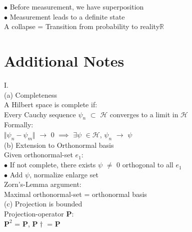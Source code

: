 \documentclass[10pt,fancy]{elegantbook}
\begin{document}
{$\bullet$ Before measurement, we have superposition  \\
  
$\bullet$ Measurement leads to a definite state  \\

A collapse = Transition from probability to reality$\mathbb R$


\section{Additional Notes}

I.  \\  

(a) Completeness  \\

A Hilbert space is complete if:  \\

    Every Cauchy sequence $\psi_n$ $\subset$ $\mathscr H$ converges to a limit in $\mathscr H$  \\
  
Formally:  \\
  
    $\Vert \psi_n - \psi_m \Vert$ $\longrightarrow$ 0 $\implies$ $\exists \psi$ $\in \mathscr H$, $\psi_n$ $\longrightarrow$ $\psi$ \\
   

(b) Extension to Orthonormal basis  \\
  

Given orthonormal-set $e_1$:  \\
  
$\bullet$ If not complete, there exists $\psi$ $\neq$ 0 orthogonal to all $e_1$  \\
  
$\bullet$ Add $\psi$, normalize enlarge set \\ 

Zorn's-Lemma argument:  \\  

Maximal orthonormal-set = orthonormal basis  \\  

(c) Projection is bounded  \\

Projection-operator $\mathbf P$:  \\  
    
    $\mathbf P^2$ = $\mathbf P$, $\mathbf {P}\dagger$ = $\mathbf P$ \\ 
    
}
\end{document}
